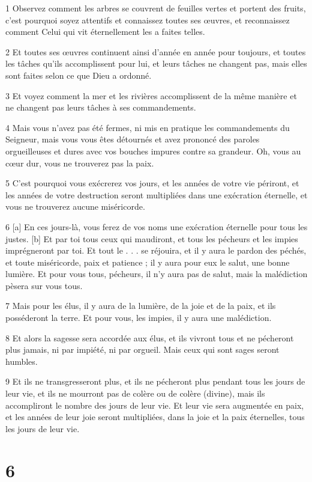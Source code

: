 \par 1 Observez comment les arbres se couvrent de feuilles vertes et portent des fruits, c'est pourquoi soyez attentifs et connaissez toutes ses œuvres, et reconnaissez comment Celui qui vit éternellement les a faites telles.
\par 2 Et toutes ses œuvres continuent ainsi d'année en année pour toujours, et toutes les tâches qu'ils accomplissent pour lui, et leurs tâches ne changent pas, mais elles sont faites selon ce que Dieu a ordonné.
\par 3 Et voyez comment la mer et les rivières accomplissent de la même manière et ne changent pas leurs tâches à ses commandements.
\par 4 Mais vous n'avez pas été fermes, ni mis en pratique les commandements du Seigneur, mais vous vous êtes détournés et avez prononcé des paroles orgueilleuses et dures avec vos bouches impures contre sa grandeur. Oh, vous au cœur dur, vous ne trouverez pas la paix.
\par 5 C'est pourquoi vous exécrerez vos jours, et les années de votre vie périront, et les années de votre destruction seront multipliées dans une exécration éternelle, et vous ne trouverez aucune miséricorde.
\par 6 [a] En ces jours-là, vous ferez de vos noms une exécration éternelle pour tous les justes. [b] Et par toi tous ceux qui maudiront, et tous les pécheurs et les impies imprégneront par toi. Et tout le . . . se réjouira, et il y aura le pardon des péchés, et toute miséricorde, paix et patience ; il y aura pour eux le salut, une bonne lumière. Et pour vous tous, pécheurs, il n'y aura pas de salut, mais la malédiction pèsera sur vous tous.
\par 7 Mais pour les élus, il y aura de la lumière, de la joie et de la paix, et ils posséderont la terre. Et pour vous, les impies, il y aura une malédiction.
\par 8 Et alors la sagesse sera accordée aux élus, et ils vivront tous et ne pécheront plus jamais, ni par impiété, ni par orgueil. Mais ceux qui sont sages seront humbles.
\par 9 Et ils ne transgresseront plus, et ils ne pécheront plus pendant tous les jours de leur vie, et ils ne mourront pas de colère ou de colère (divine), mais ils accompliront le nombre des jours de leur vie. Et leur vie sera augmentée en paix, et les années de leur joie seront multipliées, dans la joie et la paix éternelles, tous les jours de leur vie.

\chapter{6}

